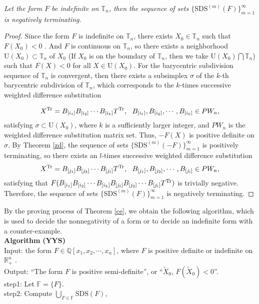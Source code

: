 \documentclass [10pt,a4paper]{article}
\begin{document}
\begin{theorem} \label{ce}
\emph{Let the form $F$ be indef\mbox{}inite on $\mathbb{T}_n$,  then
the sequence of sets $\{\textrm{SDS}^{(m)}(F)\}_{m=1}^\infty$ is
negatively terminating.}
\end{theorem}

\begin{proof}  Since the form $F$ is indef\mbox{}inite on
   $\mathbb{T}_n$,  there exists $X_0\in
\mathbb{T}_n$ such that $F(X_0)<0$ .  And $F$ is continuous on
$\mathbb{T}_n$,  so there exists a neighborhood
$\textrm{U}(X_0)\subset \mathbb{T}_n$ of $X_0$ (If $X_0$ is on the
boundary of $\mathbb{T}_n$, then we take $\textrm{U}(X_0)\bigcap
\mathbb{T}_n$) such that  $F(X)<0$ for all $X\in \textrm{U}(X_0)$.
For the  barycentric subdivision
 sequence of $ \mathbb{T}_n$ is
convergent, then there exists a subsimplex $\sigma$  of the $k$-th
barycentric subdivision of $\mathbb{T}_n$, which corresponds to the
$k$-times successive weighted dif\mbox{}ference substitution

 $$X^{\textmd{Tr}}=B_{[i_1]}B_{[i_2]}\cdots B_{[i_k]}T^{\textmd{Tr}},~~ B_{[i_1]}, B_{[i_2]}, \cdots,B_{[i_k]}\in PW_n,$$
 satisfying $\sigma
\subset\textrm{U}(X_0)$, where $k$ is a  suf\mbox{}f\mbox{}iciently
larger integer, and $PW_n$ is the weighted dif\mbox{}ference
 substitution matrix set.  Thus, $-F(X)$ is positive definite on
 $\sigma$. By Theorem  \ref{zd},
the sequence of  sets $\{\textrm{SDS}^{(m)}(-F)\}_{m=1}^\infty$ is
positively terminating, so there exists an
 $l$-times successive
weighted dif\mbox{}ference substitution
 $$X^{\textmd{Tr}}=B_{[j_1]}B_{[j_2]}\cdots
B_{[j_l]}T^{\textmd{Tr}},  ~~ B_{[j_1]}, B_{[j_2]},
\cdots,B_{[j_l]}\in PW_n,$$
 satisfying that $F(B_{[i_1]}B_{[i_2]}\cdots B_{[i_k]}B_{[j_l]}B_{[j_2]}\cdots B_{[j_l]}T^{\textmd{Tr}})$
 is trivially negative. Therefore, the sequence of sets $\{\textrm{SDS}^{(m)}(F)\}_{m=1}^\infty$ is
negatively terminating.\end{proof}






By the proving process of Theorem \ref{ce},  we obtain the following
algorithm,  which is used to decide the  nonnegativity of a form or
to decide an indef\mbox{}inite form with a
counter-example.\\
\textbf{Algorithm} \textbf{(YYS)}\\
Input: the form  $F\in \mathbb{Q}[x_1,x_2,\cdots, x_n]$, where  $F$ is positive def\mbox{}inite or indef\mbox{}inite on $ \mathbb{R}_{+}^n$ .  \\
Output:  ``The form $F$ is positive semi-def\mbox{}inite'', or ``$\tilde{X}_0$, $F(\tilde{X}_0)<0$''.\\
step1: Let  $\mathbb{F}=\{F\}$.\\
step2:  Compute $\bigcup\limits_{F\in\mathbb{F}}\textrm{SDS}(F)$,
\end{document}
